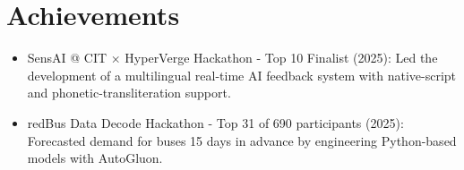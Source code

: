 \documentclass[letterpaper,11pt]{article}
\newcommand{\resumeItem}[1]{
  \item\small{
    {#1 \vspace{-2pt}}
  }
}
\newcommand{\resumeItemListStart}{\begin{itemize}}
\newcommand{\resumeItemListEnd}{\end{itemize}\vspace{-5pt}}
\begin{document}
\section{Achievements}
\resumeItemListStart
    \resumeItem{SensAI @ CIT × HyperVerge Hackathon - Top 10 Finalist (2025): Led the development of a multilingual real-time AI feedback system with native-script and phonetic-transliteration support.}
    \resumeItem{redBus Data Decode Hackathon - Top 31 of 690 participants (2025): Forecasted demand for buses 15 days in advance by engineering Python-based models with AutoGluon.}
\resumeItemListEnd
\end{document}
